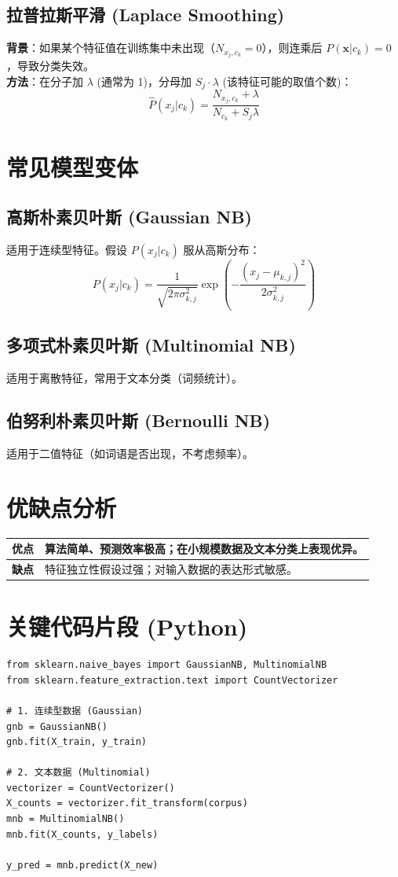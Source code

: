 \documentclass[12pt, a4paper]{article}
\begin{document}
\subsection{拉普拉斯平滑 (Laplace Smoothing)}
\textbf{背景}：如果某个特征值在训练集中未出现（$N_{x_j, c_k} = 0$），则连乘后 $P(\mathbf{x}|c_k) = 0$，导致分类失效。
\\ \textbf{方法}：在分子加 $\lambda$ (通常为 1)，分母加 $S_j \cdot \lambda$ (该特征可能的取值个数)：
$$ \hat{P}(x_j|c_k) = \frac{N_{x_j, c_k} + \lambda}{N_{c_k} + S_j \lambda} $$

\section{常见模型变体}

\subsection{高斯朴素贝叶斯 (Gaussian NB)}
适用于连续型特征。假设 $P(x_j|c_k)$ 服从高斯分布：
$$ P(x_j|c_k) = \frac{1}{\sqrt{2\pi\sigma_{k,j}^2}} \exp\left( -\frac{(x_j - \mu_{k,j})^2}{2\sigma_{k,j}^2} \right) $$

\subsection{多项式朴素贝叶斯 (Multinomial NB)}
适用于离散特征，常用于文本分类（词频统计）。

\subsection{伯努利朴素贝叶斯 (Bernoulli NB)}
适用于二值特征（如词语是否出现，不考虑频率）。

\section{优缺点分析}
\begin{table}[h]
\centering
\begin{tabularx}{\textwidth}{|l|X|}
\hline
\textbf{优点} & 算法简单、预测效率极高；在小规模数据及文本分类上表现优异。 \\
\hline
\textbf{缺点} & 特征独立性假设过强；对输入数据的表达形式敏感。 \\
\hline
\end{tabularx}
\end{table}

\section{关键代码片段 (Python)}
\begin{lstlisting}
from sklearn.naive_bayes import GaussianNB, MultinomialNB
from sklearn.feature_extraction.text import CountVectorizer

# 1. 连续型数据 (Gaussian)
gnb = GaussianNB()
gnb.fit(X_train, y_train)

# 2. 文本数据 (Multinomial)
vectorizer = CountVectorizer()
X_counts = vectorizer.fit_transform(corpus)
mnb = MultinomialNB()
mnb.fit(X_counts, y_labels)

y_pred = mnb.predict(X_new)
\end{lstlisting}
\end{document}
